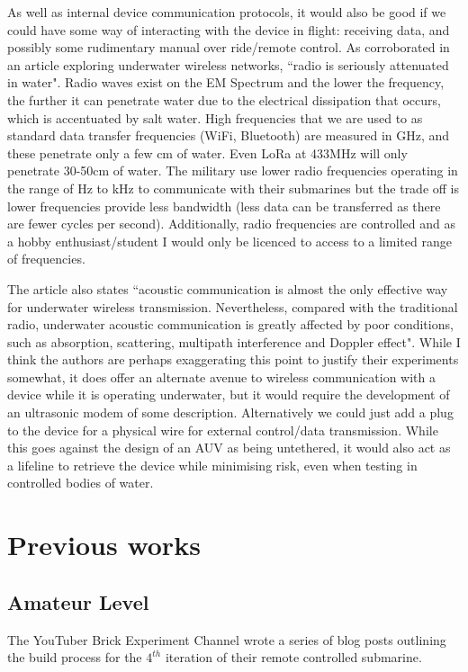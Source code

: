 \documentclass[11pt,a4paper,titlepage]{report}
\begin{document}
	As well as internal device communication protocols, it would also be good if we could have some way of interacting with the device in flight: receiving data, and possibly some rudimentary manual over ride/remote control. As corroborated in an article exploring underwater wireless networks, ``radio is seriously attenuated in water"\cite{UNDERWATER_RADIO}. Radio waves exist on the EM Spectrum and the lower the frequency, the further it can penetrate water due to the electrical dissipation that occurs, which is accentuated by salt water. High frequencies that we are used to as standard data transfer frequencies (WiFi, Bluetooth) are measured in \unit{\giga\hertz}, and these penetrate only a few \unit{\centi\meter} of water. Even LoRa at 433\unit{\mega\hertz} will only penetrate 30-50\unit{\centi\meter} of water. The military use lower radio frequencies operating in the range of \unit{\hertz} to \unit{\kilo\hertz} to communicate with their submarines but the trade off is lower frequencies provide less bandwidth (less data can be transferred as there are fewer cycles per second). Additionally, radio frequencies are controlled\cite{RADIO_FREQ_TABLE} and as a hobby enthusiast/student I would only be licenced to access to a limited range of frequencies.  
	
	The article also states ``acoustic communication is almost the only effective way for underwater wireless transmission. Nevertheless, compared with the traditional radio, underwater acoustic communication is greatly affected by poor conditions, such as absorption, scattering, multipath interference and Doppler effect"\cite{UNDERWATER_RADIO}. While I think the authors are perhaps exaggerating this point to justify their experiments somewhat, it does offer an alternate avenue to wireless communication with a device while it is operating underwater, but it would require the development of an ultrasonic modem of some description. Alternatively we could just add a plug to the device for a physical wire for external control/data transmission. While this goes against the design of an AUV as being untethered, it would also act as a lifeline to retrieve the device while minimising risk, even when testing in controlled bodies of water.
	
		\section*{Previous works}
	\subsection*{Amateur Level}
	The YouTuber Brick Experiment Channel\cite{BRICK_EXPERIMENT_CHANNEL_PROFILE} wrote a series of blog posts\cite{BRICK_EXPERIMENT_CHANNEL_BLOG} outlining the build process for the $4^{th}$ iteration of their remote controlled submarine. 
	
\end{document}
